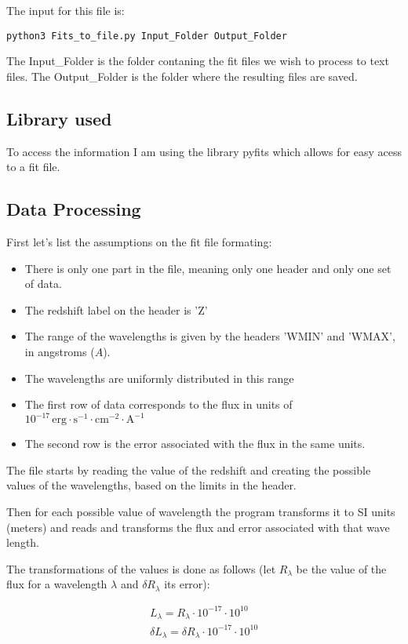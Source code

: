\documentclass[11pt]{report}
\newcommand{\unit}[1]{\ensuremath{\, \mathrm{#1}}}
\begin{document}
The input for this file is:
\begin{verbatim}
python3 Fits_to_file.py Input_Folder Output_Folder
\end{verbatim}

The Input\_Folder is the folder contaning the fit files we wish to process to text files. The Output\_Folder is the folder where the resulting files are saved.

\subsection{Library used}

To access the information I am using the library pyfits which allows for easy acess to a fit file.

\subsection{Data Processing}

First let's list the assumptions on the fit file formating:
\begin{itemize}
\item There is only one part in the file, meaning only one header and only one set of data.
\item The redshift label on the header is 'Z'
\item The range of the wavelengths is given by the headers 'WMIN' and 'WMAX', in angstroms ($A$).
\item The wavelengths are uniformly distributed in this range
\item The first row of data corresponds to the flux in units of $10^{-17}\unit{erg\cdot s^{-1}\cdot cm^{-2} \cdot A^{-1}}$
\item The second row is the error associated with the flux in the same units.
\end{itemize}

The file starts by reading the value of the redshift and creating the possible values of the wavelengths, based on the limits in the header.

Then for each possible value of wavelength the program transforms it to SI units (meters) and reads and transforms the flux and error associated with that wave length.

The transformations of the values is done as follows (let $R_\lambda$ be the value of the flux for a wavelength $\lambda$ and $\delta R_\lambda$ its error):

\begin{align*}
L_\lambda = R_\lambda \cdot 10^{-17} \cdot 10^{10}\\
\delta L_\lambda = \delta R_\lambda \cdot 10^{-17} \cdot 10^{10}\\
\end{align*}
\end{document}
